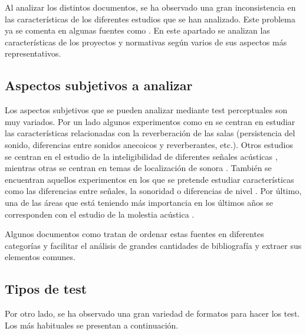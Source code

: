 \documentclass[11pt,a4paper]{book}
\begin{document}
    Al analizar los distintos documentos, se ha observado una gran inconsistencia en las características de los diferentes estudios que se han analizado. Este problema ya se comenta en algunas fuentes como \cite{Tejada2020}. En este apartado se analizan las características de los proyectos y normativas según varios de sus aspectos más representativos. 
    
        \subsection{Aspectos subjetivos a analizar}
		    Los aspectos subjetivos que se pueden analizar mediante test perceptuales son muy variados. Por un lado algunos experimentos como en \cite{1995GASoulodre, 2016SKlockgether,  2016BPostma, 2002PZahorik} se centran en estudiar las características relacionadas con la reverberación de las salas (persistencia del sonido, diferencias entre sonidos anecoicos y reverberantes, etc.). Otros estudios se centran en el estudio de la inteligibilidad de diferentes señales acústicas \cite{ 1999JBradley, 2010FMartellotta,  2010MVigeant}, mientras otras se centran en temas de localización de sonora \cite{1997SCarlile, 2019MShiell, 2019MYamada, 2019DMorikawa}. También se encuentran aquellos experimentos en los que se pretende estudiar características como las diferencias entre señales, la sonoridad o diferencias de nivel \cite{2019GPulvirenti, 2016SKlockgether, 2019MNowak, 2011VEmiya, 2019LKritly, 2005IWitew,  2019DJSchlit}. Por último, una de las áreas que está teniendo más importancia en los últimos años se corresponden con el estudio de la molestia acústica \cite{2019VHongisto, 2019JLee, 2019VRajala}.
		    
            Algunos documentos como \cite{Tejada2020} tratan de ordenar estas fuentes en diferentes categorías y facilitar el análisis de grandes cantidades de bibliografía y extraer sus elementos comunes.
            
        \subsection{Tipos de test}
    		Por otro lado, se ha observado una gran variedad de formatos para hacer los test. Los más habituales se presentan a continuación.
    
\end{document}
